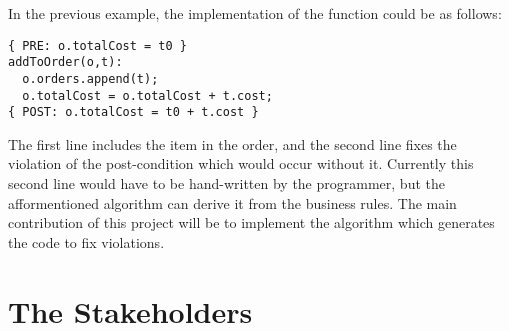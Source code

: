 \documentclass[12pt]{report}
\begin{document}
In the previous example, the implementation of the
function could be as follows: 

\begin{verbatim}
{ PRE: o.totalCost = t0 } 
addToOrder(o,t): 
  o.orders.append(t);
  o.totalCost = o.totalCost + t.cost;
{ POST: o.totalCost = t0 + t.cost } 
\end{verbatim}

The first line includes the item in the order, and the second line fixes the
violation of the post-condition which would occur without it. Currently this
second line would have to be hand-written by the programmer, but the
afformentioned  algorithm can derive it from the business rules. The main
contribution of this project will be to implement the algorithm which generates
the code to fix violations.

\section{The Stakeholders}\label{sec:Stakeholders}

\end{document}
